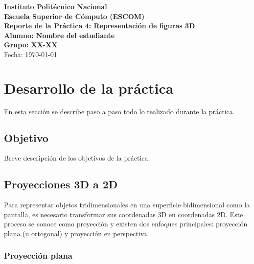 \documentclass[12pt]{article}
\begin{document}
    \begin{titlepage}
        \centering
        {\Large \textbf{Instituto Politécnico Nacional}}\\[0.3cm]
        {\Large \textbf{Escuela Superior de Cómputo (ESCOM)}}\\[1.5cm]

        {\Huge \textbf{Reporte de la Práctica 4: Representación de figuras 3D}}\\[2cm]

        {\large \textbf{Alumno: Nombre del estudiante}}\\[0.3cm]
        {\large \textbf{Grupo: XX-XX}}\\[0.3cm]
        {\large Fecha: \today}\\[3cm]


        \vfill
    \end{titlepage}

    \tableofcontents
    \newpage

    \section{Desarrollo de la práctica}
    En esta sección se describe paso a paso todo lo realizado durante la práctica.

    \subsection{Objetivo}
    Breve descripción de los objetivos de la práctica.

    \subsection{Proyecciones 3D a 2D}

    Para representar objetos tridimensionales en una superficie bidimensional como la pantalla, es necesario transformar sus coordenadas 3D en coordenadas 2D. Este proceso se conoce como proyección y existen dos enfoques principales: proyección plana (u ortogonal) y proyección en perspectiva.

    \subsubsection{Proyección plana}
\end{document}
